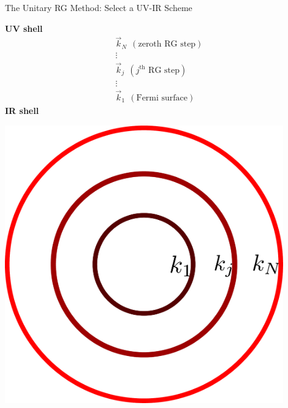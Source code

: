 \documentclass[10pt,aspectratio=169]{beamer}
\newcommand{\focus}[1]{\textcolor{lblue}{\textbf{#1}}}
\begin{document}
\begin{frame}[noframenumbering]{The Unitary RG Method: Select a UV-IR Scheme}
\vspace*{\fill}

\begin{minipage}{0.5\textwidth}
\centering
\focus{UV shell}
\begin{gather*}
	\vec k_N ~~ \left(\text{zeroth RG step}\right)\\
\vdots\\ 
\vec k_j ~ ~ \left(j^\text{th} \text{ RG step}\right) \\
\vdots\\
\vec k_1 ~ ~ \left(\text{Fermi surface}\right)
\end{gather*}
\focus{IR shell}
\end{minipage}
\hspace*{\fill}
\begin{minipage}{0.4\textwidth}
\includegraphics[width=0.9\textwidth]{figures/uv_ir_scheme.pdf}
\end{minipage}
\vspace*{\fill}
\end{frame}
\end{document}

